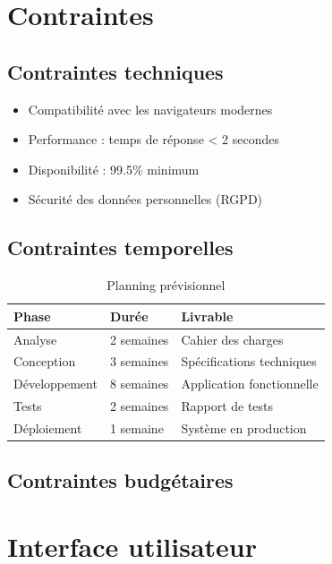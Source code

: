 \documentclass[12pt,a4paper]{article}
\begin{document}
\section{Contraintes}

\subsection{Contraintes techniques}

\begin{itemize}
    \item Compatibilité avec les navigateurs modernes
    \item Performance : temps de réponse < 2 secondes
    \item Disponibilité : 99.5\% minimum
    \item Sécurité des données personnelles (RGPD)
\end{itemize}

\subsection{Contraintes temporelles}

\lipsum[11]

\begin{table}[h]
\centering
\begin{tabular}{|l|l|l|}
\hline
\textbf{Phase} & \textbf{Durée} & \textbf{Livrable} \\
\hline
Analyse & 2 semaines & Cahier des charges \\
\hline
Conception & 3 semaines & Spécifications techniques \\
\hline
Développement & 8 semaines & Application fonctionnelle \\
\hline
Tests & 2 semaines & Rapport de tests \\
\hline
Déploiement & 1 semaine & Système en production \\
\hline
\end{tabular}
\caption{Planning prévisionnel}
\end{table}

\subsection{Contraintes budgétaires}

\lipsum[12]

\section{Interface utilisateur}
\end{document}
